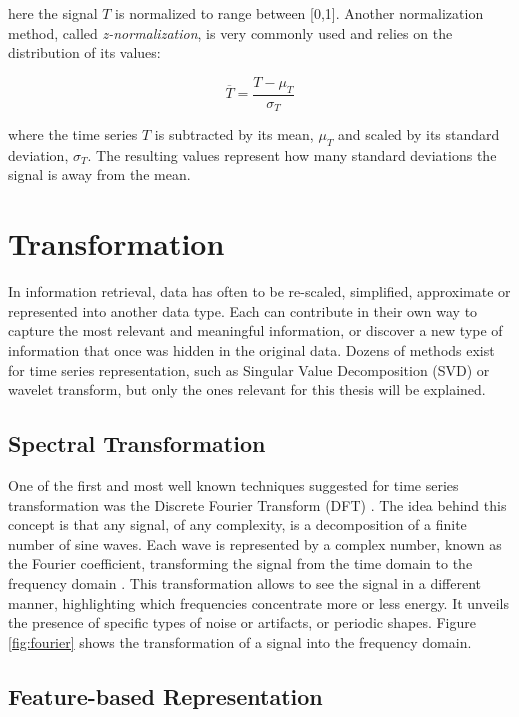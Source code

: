here the signal $T$ is normalized to range between [0,1].
Another normalization method, called \textit{z-normalization}, is very commonly used and relies on the distribution of its values:

\begin{equation}
\overline{T} = \frac{T-\mu_T}{\sigma_T}
\end{equation}

where the time series $T$ is subtracted by its mean, $\mu_T$ and scaled by its standard deviation, $\sigma_T$. The resulting values represent how many standard deviations the signal is away from the mean.


\section{Transformation} 
\label{sec:transform}

In information retrieval, data has often to be re-scaled, simplified, approximate or represented into another data type. Each can contribute in their own way to capture the most relevant and meaningful information, or discover a new type of information that once was hidden in the original data. Dozens of methods exist for time series representation, such as Singular Value Decomposition (SVD) or wavelet transform, but only the ones relevant for this thesis will be explained.

\subsection{Spectral Transformation}
\label{subsec:spec_transform}

One of the first and most well known techniques suggested for time series transformation was the Discrete Fourier Transform (DFT) \citep{fourier}. The idea behind this concept is that any signal, of any complexity, is a decomposition of a finite number of sine waves. Each wave is represented by a complex number, known as the Fourier coefficient, transforming the signal from the time domain to the frequency domain \cite{fourier2}. This transformation allows to see the signal in a different manner, highlighting which frequencies concentrate more or less energy. It unveils the presence of specific types of noise or artifacts, or periodic shapes. Figure \ref{fig:fourier} shows the transformation of a signal into the frequency domain.


\subsection{Feature-based Representation}
\label{subsec:features}

